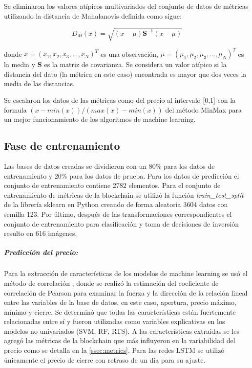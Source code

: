 Se eliminaron los valores atípicos multivariados del conjunto de datos de métricas utilizando la distancia de  Mahalanovis definida como sigue:

\[ D_M(x) = \sqrt{(x-\mu)\textbf{S}^{-1}(x-\mu)} \]

donde $x = (x_1,x_2,x_3,...,x_N)^T$ es una observación, $\mu = (\mu_1,\mu_2,\mu_3,...,\mu_N)^T$ es la media y $\textbf{S}$ es la matriz de covarianza. Se considera un valor atípico si la distancia del dato (la métrica en este caso) encontrada es mayor que dos veces la media de las distancias.


Se escalaron los datos de las métricas como del precio al intervalo [0,1] con la formula $(x-min(x))/(max(x)-min(x))$ del método MinMax para un mejor funcionamiento de los algoritmos de machine learning. 	 

\subsection{Fase de entrenamiento}

Las bases de datos creadas se dividieron con un 80\% para los datos de entrenamiento y 20\% para los datos de prueba. Para los datos de predicción el conjunto de entrenamiento contiene 2782 elementos. Para el conjunto de entrenamiento de métricas de la blockchain se utilizó la función \emph{train\_test\_split} de la librería sklearn en Python creando de forma aleatoria 3604 datos con semilla 123. Por último, después de las transformaciones correspondientes el conjunto de entrenamiento para clasificación y toma de decisiones de inversión resulto en 616 imágenes.

\subparagraph{Predicción del precio:} Para la extracción de características de los modelos de machine learning se usó el método de correlación \cite{tandonBitcoinPriceForecasting2019}, donde se realizó la estimación del coeficiente de correlación de Pearson para examinar la fuerza y la dirección de la relación lineal entre las variables de la base de datos, en este caso, apertura, precio máximo, mínimo y cierre. Se determinó que todas las características están fuertemente relacionadas entre sí y fueron utilizadas como variables explicativas en los modelos no univariados (SVM, RF, RTS). A las características extraídas se les agregó las métricas de la blockchain que más influyeron en la variabilidad del precio como se detalla en la \autoref{ssec:metrics}.    
Para las redes LSTM se utilizó únicamente el precio de cierre con retraso de un día para su ajuste.

